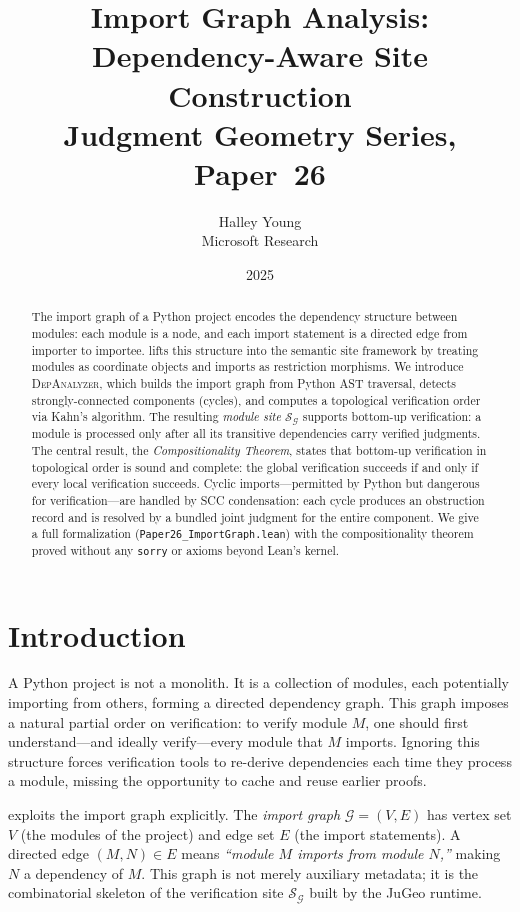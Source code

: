 \documentclass[11pt]{article}
\title{Import Graph Analysis:\\
       Dependency-Aware Site Construction\\[4pt]
       {\large Judgment Geometry Series, Paper~26}}
\author{Halley Young\\[2pt] Microsoft Research}
\date{2025}
\newcommand{\IG}{\mathcal{G}}              %
\newcommand{\DA}{\textsc{DepAnalyzer}}     %
\newcommand{\ModSite}{\mathcal{S}_{\IG}}   %
\begin{document}
\maketitle

\begin{abstract}
The import graph of a Python project encodes the dependency structure
between modules: each module is a node, and each import statement is a
directed edge from importer to importee.  \JuGeo{} lifts this structure
into the semantic site framework by treating modules as coordinate objects
and imports as restriction morphisms.  We introduce \DA{}, which builds
the import graph from Python AST traversal, detects strongly-connected
components (cycles), and computes a topological verification order via
Kahn's algorithm.  The resulting \emph{module site} $\ModSite$ supports
bottom-up verification: a module is processed only after all its
transitive dependencies carry verified judgments.  The central result,
the \emph{Compositionality Theorem}, states that bottom-up verification
in topological order is sound and complete: the global verification
succeeds if and only if every local verification succeeds.  Cyclic
imports—permitted by Python but dangerous for verification—are handled
by SCC condensation: each cycle produces an obstruction record and is
resolved by a bundled joint judgment for the entire component.  We give
a full \LEAN{} formalization (\texttt{Paper26\_ImportGraph.lean}) with
the compositionality theorem proved without any \texttt{sorry} or
axioms beyond Lean's kernel.
\end{abstract}


\section{Introduction}
\label{sec:intro}

A Python project is not a monolith.  It is a collection of modules,
each potentially importing from others, forming a directed dependency
graph.  This graph imposes a natural partial order on verification: to
verify module $M$, one should first understand—and ideally verify—every
module that $M$ imports.  Ignoring this structure forces verification
tools to re-derive dependencies each time they process a module, missing
the opportunity to cache and reuse earlier proofs.

\JuGeo{} exploits the import graph explicitly.  The \emph{import graph}
$\IG = (V, E)$ has vertex set $V$ (the modules of the project) and edge
set $E$ (the import statements).  A directed edge $(M, N) \in E$ means
\emph{``module $M$ imports from module $N$,''} making $N$ a dependency
of $M$.  This graph is not merely auxiliary metadata; it is the
combinatorial skeleton of the verification site $\ModSite$ built by the
JuGeo runtime.
\end{document}
